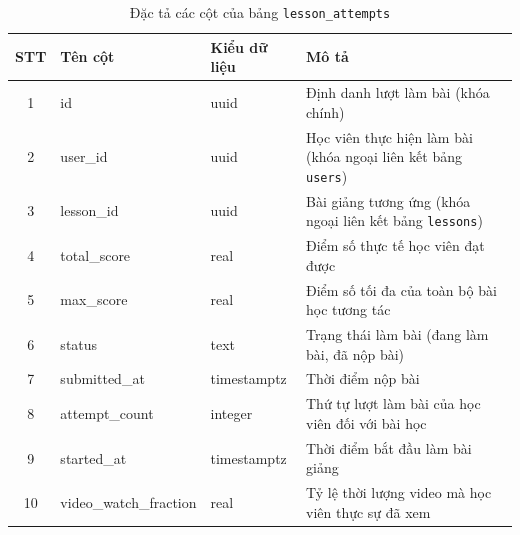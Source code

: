 \documentclass[../DoAn.tex]{subfiles}
\begin{document}
\begin{table}[H]
\centering
\small
\renewcommand{\arraystretch}{1.3}
\begin{tabular}{|c|l|l|p{6.2cm}|}
\hline
\textbf{STT} & \textbf{Tên cột} & \textbf{Kiểu dữ liệu} & \textbf{Mô tả} \\ \hline
1 & id & uuid & Định danh lượt làm bài (khóa chính) \\ \hline
2 & user\_id & uuid & Học viên thực hiện làm bài (khóa ngoại liên kết bảng \texttt{users}) \\ \hline
3 & lesson\_id & uuid & Bài giảng tương ứng (khóa ngoại liên kết bảng \texttt{lessons}) \\ \hline
4 & total\_score & real & Điểm số thực tế học viên đạt được \\ \hline
5 & max\_score & real & Điểm số tối đa của toàn bộ bài học tương tác \\ \hline
6 & status & text & Trạng thái làm bài (đang làm bài, đã nộp bài) \\ \hline
7 & submitted\_at & timestamptz & Thời điểm nộp bài \\ \hline
8 & attempt\_count & integer & Thứ tự lượt làm bài của học viên đối với bài học \\ \hline
9 & started\_at & timestamptz & Thời điểm bắt đầu làm bài giảng \\ \hline
10 & video\_watch\_fraction & real & Tỷ lệ thời lượng video mà học viên thực sự đã xem \\ \hline
\end{tabular}
\caption{Đặc tả các cột của bảng \texttt{lesson\_attempts}}
\label{tbl:lesson_attempts}
\end{table}
\end{document}

